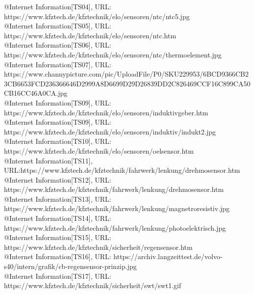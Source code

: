 @Internet{ Information[TS04],
	URL: https://www.kfztech.de/kfztechnik/elo/sensoren/ntc/ntc5.jpg}
\\

@Internet{ Information[TS05],
	URL: https://www.kfztech.de/kfztechnik/elo/sensoren/ntc.htm}
\\

@Internet{ Information[TS06],
	URL: https://www.kfztech.de/kfztechnik/elo/sensoren/ntc/thermoelement.jpg}
\\

@Internet{ Information[TS07],
	URL: https://www.channypicture.com/pic/UploadFile/P0/SKU229953/6BCD9366CB23CB6653FCD236366646D2999A8D6699D29D26839DD2C826469CCF16C899CA50CB16CC46A0CA.jpg}
\\

@Internet{ Information[TS09],
	URL:
https://www.kfztech.de/kfztechnik/elo/sensoren/induktivgeber.htm\
\\

@Internet{ Information[TS09],
	URL: https://www.kfztech.de/kfztechnik/elo/sensoren/induktiv/indukt2.jpg}
\\

@Internet{ Information[TS10],
	URL: https://www.kfztech.de/kfztechnik/elo/sensoren/oelsensor.htm}
\\

@Internet{ Information[TS11],
	URL:https://www.kfztech.de/kfztechnik/fahrwerk/lenkung/drehmosensor.htm}
\\

@Internet{ Information[TS12],
	URL: https://www.kfztech.de/kfztechnik/fahrwerk/lenkung/drehmosensor.htm}
\\

@Internet{ Information[TS13],
	URL: https://www.kfztech.de/kfztechnik/fahrwerk/lenkung/magnetroresistiv.jpg}
\\

@Internet{ Information[TS14],
	URL: https://www.kfztech.de/kfztechnik/fahrwerk/lenkung/photoelektrisch.jpg}
\\

@Internet{ Information[TS15],
	URL: https://www.kfztech.de/kfztechnik/sicherheit/regensensor.htm}
\\

@Internet{ Information[TS16],
	URL: https://archiv.langzeittest.de/volvo-s40/intern/grafik/cb-regensensor-prinzip.jpg}
\\

@Internet{ Information[TS17],
	URL: https://www.kfztech.de/kfztechnik/sicherheit/swt/swt1.gif}
\\

}
